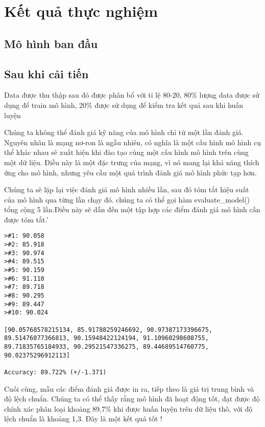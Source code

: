 \section{Kết quả thực nghiệm}
\subsection{Mô hình ban đầu}
\subsection{Sau khi cải tiến}


Data được thu thập sau đó được phân bổ với tỉ lệ 80-20, 80\% lượng data được sử dụng để train mô hình, 20\% được sử dụng để kiểm tra kết quả sau khi huấn luyện

Chúng ta không thể đánh giá kỹ năng của mô hình chỉ từ một lần đánh giá.
Nguyên nhân là mạng nơ-ron là ngẫu nhiên, có nghĩa là một cấu hình mô hình cụ thể khác nhau sẽ xuất hiện khi đào tạo cùng một cấu hình mô hình trên cùng một dữ liệu. Điều này là một đặc trưng của mạng, vì nó mang lại khả năng thích ứng cho mô hình, nhưng yêu cầu một quá trình đánh giá mô hình phức tạp hơn.

Chúng ta sẽ lặp lại việc đánh giá mô hình nhiều lần, sau đó tóm tắt hiệu suất của mô hình qua từng lần chạy đó. chúng ta có thể gọi hàm evaluate\_model() tổng cộng 5 lần.Điều này sẽ dẫn đến một tập hợp các điểm đánh giá mô hình cần được tóm tắt.'\\

\begin{lstlisting}
>#1: 90.058
>#2: 85.918
>#3: 90.974
>#4: 89.515
>#5: 90.159
>#6: 91.110
>#7: 89.718
>#8: 90.295
>#9: 89.447
>#10: 90.024

[90.05768578215134, 85.91788259246692, 90.97387173396675, 89.51476077366813, 90.15948422124194, 91.10960298608755, 89.71835765184933, 90.29521547336275, 89.44689514760775, 90.02375296912113]

Accuracy: 89.722% (+/-1.371)

\end{lstlisting}
Cuối cùng, mẫu các điểm đánh giá được in ra, tiếp theo là giá trị trung bình và độ lệch chuẩn. Chúng ta có thể thấy rằng mô hình đã hoạt động tốt, đạt được độ chính xác phân loại khoảng 89,7\% khi được huấn luyện trên dữ liệu thô, với độ lệch chuẩn là khoảng 1,3. Đây là một kết quả tốt ! 
\subsection{}

